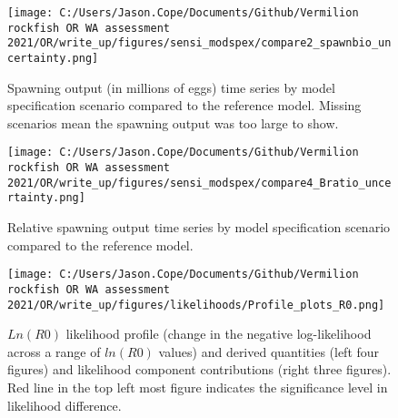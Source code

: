 \documentclass[11pt,
  english,
  a4paper,
]{article}
\begin{document}

\begin{figure}
\centering
\texttt{[image: C:/Users/Jason.Cope/Documents/Github/Vermilion rockfish OR WA assessment 2021/OR/write\_up/figures/sensi\_modspex/compare2\_spawnbio\_uncertainty.png]}
\caption{Spawning output (in millions of eggs) time series by model specification scenario compared to the reference model. Missing scenarios mean the spawning output was too large to show.\label{fig:sensi-modspec-ssb}}
\end{figure}

\tagmcend\tagstructend


\begin{figure}
\centering
\texttt{[image: C:/Users/Jason.Cope/Documents/Github/Vermilion rockfish OR WA assessment 2021/OR/write\_up/figures/sensi\_modspex/compare4\_Bratio\_uncertainty.png]}
\caption{Relative spawning output time series by model specification scenario compared to the reference model.\label{fig:sensi-modspec-depl}}
\end{figure}

\tagmcend\tagstructend


\begin{figure}
\centering
\texttt{[image: C:/Users/Jason.Cope/Documents/Github/Vermilion rockfish OR WA assessment 2021/OR/write\_up/figures/likelihoods/Profile\_plots\_R0.png]}
\caption{{\(Ln(R0)\)\leavevmode\tagmcend\tagstructend} likelihood profile (change in the negative log-likelihood across a range of {\(ln(R0)\)\leavevmode\tagmcend\tagstructend} values) and derived quantities (left four figures) and likelihood component contributions (right three figures). Red line in the top left most figure indicates the significance level in likelihood difference.\label{fig:r0-profile-combo}}
\end{figure}
\end{document}
